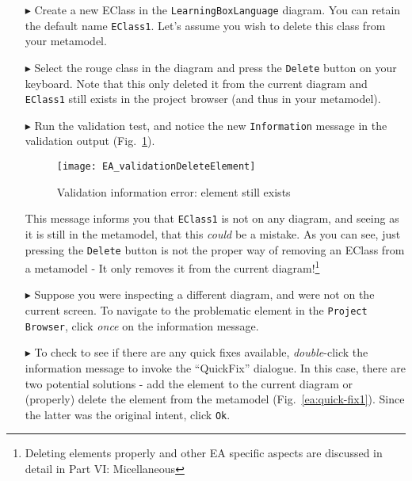 \begin{enumerate}
\item[$\blacktriangleright$] Create a new EClass in the \texttt{Learning\-Box\-Language} diagram. You can retain the default name \texttt{EClass1}. Let's
assume you wish to delete this class from your metamodel.

\item[$\blacktriangleright$] Select the rouge class in the diagram and press the \texttt{Delete} button on your keyboard. Note that this only deleted it from
the current diagram and \texttt{EClass1} still exists in the project browser (and thus in your metamodel).

\item[$\blacktriangleright$] Run the validation test, and notice the new \texttt{Information} message in the validation output
(Fig.~\ref{ea:validation_information}).

\begin{figure}[htbp]
	\centering
  \texttt{[image: EA\_validationDeleteElement]}
	\caption{Validation information error: element still exists}
	\label{ea:validation_information}
\end{figure}

This message informs you that \texttt{EClass1} is not on any diagram, and seeing as it is still in the metamodel, that this \emph{could} be a mistake. As you
can see, just pressing the \texttt{Delete} button is not the proper way of removing an EClass from a metamodel - It only removes it from the current
diagram!\footnote{Deleting elements properly and other EA specific aspects are discussed in detail in Part VI: Micellaneous}

\item[$\blacktriangleright$] Suppose you were inspecting a different diagram, and were not on the current screen. To navigate to the problematic element in the
\texttt{Project Browser}, click \emph{once} on the information message.

\newpage

\item[$\blacktriangleright$] To check to see if there are any quick fixes available, \emph{double}-click the information message to invoke the ``QuickFix''
dialogue. In this case, there are two potential solutions - add the element to the current diagram or (properly) delete the element from the metamodel
(Fig.~\ref{ea:quick-fix1}). Since the latter was the original intent, click \texttt{Ok}.

\vspace{0.5cm}


\end{enumerate}
